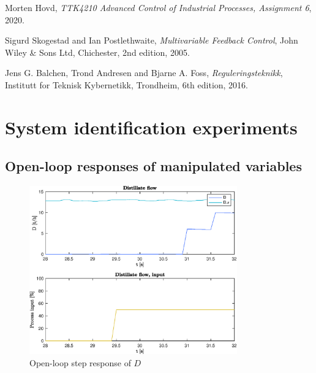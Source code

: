 \documentclass[12pt]{article}
\begin{document}
\newpage
\begin{thebibliography}{9}

  Morten Hovd,
  \textit{TTK4210 Advanced Control of Industrial Processes, Assignment 6},
  2020.

  Sigurd Skogestad and Ian Postlethwaite,
  \textit{Multivariable Feedback Control},
  John Wiley \& Sons Ltd, Chichester,
  2nd edition,
  2005.
  
  Jens G. Balchen, Trond Andresen and Bjarne A. Foss,
  \textit{Reguleringsteknikk},
  Institutt for Teknisk Kybernetikk, Trondheim,
  6th edition,
  2016.

\end{thebibliography}

\newpage
\appendix
\section{System identification experiments}
\subsection{Open-loop responses of manipulated variables}

\begin{figure}[p]
\centering
\includegraphics[width=0.8\textwidth]{../Systemanalyse/Log_Data_to_Matlab/Figurer/Stegeksperimenter/FC1005.eps}
\caption{Open-loop step response of $D$}
\label{fig:ol_step_FC1005}
\end{figure}
\end{document}
